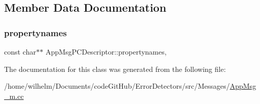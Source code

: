 \subsection{Member Data Documentation}
\mbox{\label{class_app_msg_p_c_descriptor_aaeca386eddf80dd71ff4cdd3bb1353a7}} 
\subsubsection{\texorpdfstring{propertynames}{propertynames}}
{\footnotesize\ttfamily const char$\ast$$\ast$ App\+Msg\+P\+C\+Descriptor\+::propertynames\hspace{0.3cm}{\ttfamily [mutable]}, {\ttfamily [private]}}



The documentation for this class was generated from the following file\+:\begin{DoxyCompactItemize}
\item 
/home/wilhelm/\+Documents/code\+Git\+Hub/\+Error\+Detectors/src/\+Messages/\hyperlink{_app_msg__m_8cc}{App\+Msg\+\_\+m.\+cc}\end{DoxyCompactItemize}
